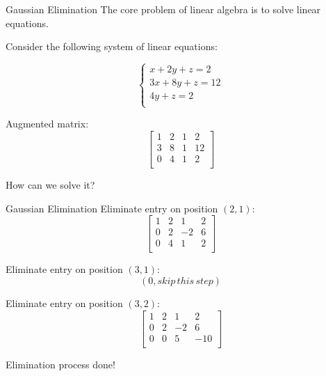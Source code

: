 \documentclass{beamer}
\begin{document}
\begin{frame}{Gaussian Elimination}
The core problem of linear algebra is to solve linear equations.

Consider the following system of linear equations:

\begin{equation*}
    \begin{cases}
        x+2y+z=2\\
        3x+8y+z=12\\
        4y+z=2\\
    \end{cases}
\end{equation*}

Augmented matrix:
\begin{equation*}
    \left[ \begin{matrix}
        1&		2&		1&		2\\
        3&		8&		1&		12\\
        0&		4&		1&		2\\
    \end{matrix} \right]
\end{equation*}

How can we solve it?
\end{frame}

\begin{frame}{Gaussian Elimination}
Eliminate entry on position $(2,1)$:
\begin{equation*}
    \left[ \begin{matrix}
        1&		2&		1&		2\\
        0&		2&		-2&		6\\
        0&		4&		1&		2\\
    \end{matrix} \right]
\end{equation*}

Eliminate entry on position $(3,1)$:
\begin{equation*}
    (0, skip \, this \, step)
\end{equation*}

Eliminate entry on position $(3,2)$:
\begin{equation*}
    \left[ \begin{matrix}
        1&		2&		1&		2\\
        0&		2&		-2&		6\\
        0&		0&		5&		-10\\
    \end{matrix} \right]
\end{equation*}

Elimination process done!
\end{frame}
\end{document}
